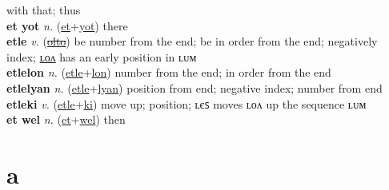 with that; thus \label{et uat} \\
\textbf{et yot} \textit{n.} (\hyperref[et]{et}+\hyperref[yot]{yot})
there \label{et yot} \\
\textbf{etle} \textit{v.} (\hyperref[olto]{\sout{olto}})
be number from the end; be in order from the end; negatively index; \hyperref[etlelon]{ʟᴏᴧ} has an early position in ʟᴜᴍ \label{etle} \\
\textbf{etlelon} \textit{n.} (\hyperref[etle]{etle}+\hyperref[lon]{lon})
number from the end; in order from the end \label{etlelon} \\
\textbf{etlelyan} \textit{n.} (\hyperref[etle]{etle}+\hyperref[lyan]{lyan})
position from end; negative index; number from end \label{etlelyan} \\
\textbf{etleki} \textit{v.} (\hyperref[etle]{etle}+\hyperref[ki]{ki})
move up; position; ʟєꜱ moves ʟᴏᴧ up the sequence ʟᴜᴍ \label{etleki} \\
\textbf{et wel} \textit{n.} (\hyperref[et]{et}+\hyperref[wel]{wel})
then \label{et wel} 

\section{a}

